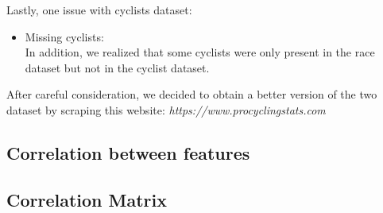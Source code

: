 \documentclass[a4paper, twoside,openright]{report}
\begin{document}
Lastly, one issue with cyclists dataset:
\begin{itemize}
    \item Missing cyclists: \\
    In addition, we realized that some cyclists were only present in the race dataset but not in the cyclist dataset.
\end{itemize}

After careful consideration, we decided to obtain a better version of the two dataset by scraping this website:
\textit{https://www.procyclingstats.com}

\subsection{Correlation between features}
\subsection{Correlation Matrix}
\end{document}
